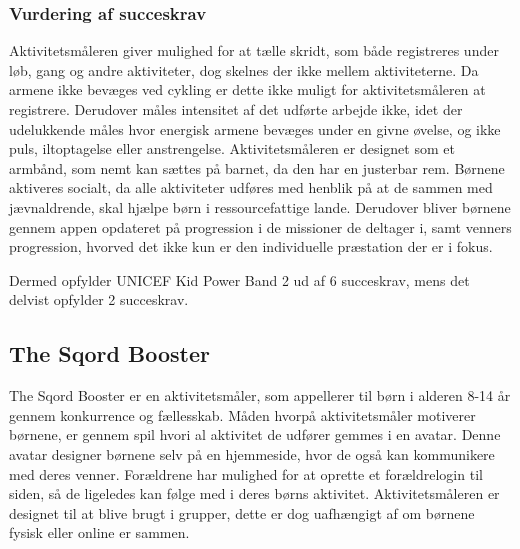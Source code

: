 
\subsubsection{Vurdering af succeskrav}
Aktivitetsmåleren giver mulighed for at tælle skridt, som både registreres under løb, gang og andre aktiviteter, dog skelnes der ikke mellem aktiviteterne. Da armene ikke bevæges ved cykling er dette ikke muligt for aktivitetsmåleren at registrere. Derudover måles intensitet af det udførte arbejde ikke, idet der udelukkende måles hvor energisk armene bevæges under en givne øvelse, og ikke puls, iltoptagelse eller anstrengelse. Aktivitetsmåleren er designet som et armbånd, som nemt kan sættes på barnet, da den har en justerbar rem. \citep{PowerManual2015} \newline
Børnene aktiveres socialt, da alle aktiviteter udføres med henblik på at de sammen med jævnaldrende, skal hjælpe børn i ressourcefattige lande. Derudover bliver børnene gennem appen opdateret på progression i de missioner de deltager i, samt venners progression, hvorved det ikke kun er den individuelle præstation der er i fokus. %
\citep{PowerAbout2015} 

Dermed opfylder UNICEF Kid Power Band 2 ud af 6 succeskrav, mens det delvist opfylder 2 succeskrav.

\subsection{The Sqord Booster}
The Sqord Booster er en aktivitetsmåler, som appellerer til børn i alderen 8-14 år gennem konkurrence og fællesskab. Måden hvorpå aktivitetsmåler motiverer børnene, er gennem spil hvori al aktivitet de udfører gemmes i en avatar. Denne avatar designer børnene selv på en hjemmeside, hvor de også kan kommunikere med deres venner. Forældrene har mulighed for at oprette et forældrelogin til siden, så de ligeledes kan følge med i deres børns aktivitet. Aktivitetsmåleren er designet til at blive brugt i grupper, dette er dog uafhængigt af om børnene fysisk eller online er sammen. \citep{Sqord_family2015}

